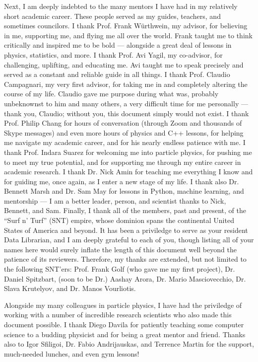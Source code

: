 \begin{acknowledgements}
Next, I am deeply indebted to the many mentors I have had in my relatively short academic career. 
These people served as my guides, teachers, and sometimes councilors. 
I thank Prof. Frank W\"urthwein, my advisor, for believing in me, supporting me, and flying me all over the world. 
Frank taught me to think critically and inspired me to be bold --- alongside a great deal of lessons in physics, statistics, and more. 
I thank Prof. Avi Yagil, my co-advisor, for challenging, uplifting, and educating me. 
Avi taught me to speak precisely and served as a constant and reliable guide in all things. 
I thank Prof. Claudio Campagnari, my very first advisor, for taking me in and completely altering the course of my life. 
Claudio gave me purpose during what was, probably unbeknownst to him and many others, a very difficult time for me personally --- thank you, Claudio; without you, this document simply would not exist. 
I thank Prof. Philip Chang for hours of conversation (through Zoom and thousands of Skype messages) and even more hours of physics and C++ lessons, for helping me navigate my academic career, and for his nearly endless patience with me. 
I thank Prof. Indara Suarez for welcoming me into particle physics, for pushing me to meet my true potential, and for supporting me through my entire career in academic research. 
I thank Dr. Nick Amin for teaching me everything I know and for guiding me, once again, as I enter a new stage of my life. 
I thank also Dr. Bennett Marsh and Dr. Sam May for lessons in Python, machine learning, and mentorship --- I am a better leader, person, and scientist thanks to Nick, Bennett, and Sam. 
Finally, I thank all of the members, past and present, of the ``Surf n' Turf'' (SNT) empire, whose dominion spans the continental United States of America and beyond. 
It has been a priviledge to serve as your resident Data Librarian, and I am deeply grateful to each of you, though listing all of your names here would surely inflate the length of this document well beyond the patience of its reviewers. 
Therefore, my thanks are extended, but not limited to the following SNT'ers: Prof. Frank Golf (who gave me my first project), Dr. Daniel Spitzbart, (soon to be Dr.) Aashay Arora, Dr. Mario Masciovecchio, Dr. Slava Krutelyov, and Dr. Manos Vourliotis.

Alongside my many colleagues in particle physics, I have had the priviledge of working with a number of incredible research scientists who also made this document possible. 
I thank Diego Davila for patiently teaching some computer science to a budding physicist and for being a great mentor and friend. 
Thanks also to Igor Sfiligoi, Dr. Fabio Andrijauskas, and Terrence Martin for the support, much-needed lunches, and even gym lessons! 


\end{acknowledgements}
